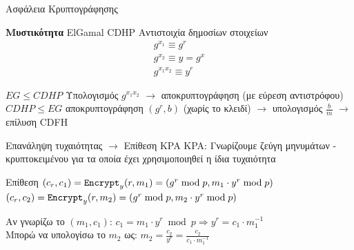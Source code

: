 \documentclass[handout]{beamer}
\begin{document}
\begin{frame}{Ασφάλεια Κρυπτογράφησης}
\begin{block}{\textbf{Μυστικότητα} ElGamal \equiv CDHP}
Αντιστοιχία δημοσίων στοιχείων
\begin{align*}
g^{x_1} \equiv g^r  \\
g^{x_2} \equiv y=g^x \\
g^{x_1x_2} \equiv y^r
\end{align*}

$EG \leq CDHP$ Υπολογισμός $g^{x_1x_2}$ $\rightarrow$ αποκρυπτογράφηση (με εύρεση αντιστρόφου)\\

$CDHP \leq EG$ αποκρυπτογράφηση $(g^r,b)$ (χωρίς το κλειδί) $\rightarrow$ υπολογισμός $\frac{b}{m}$ $\rightarrow$ επίλυση CDFH
\end{block}

\end{frame}

\begin{frame}{Επανάληψη τυχαιότητας $\rightarrow$ Επίθεση KPA}
KPA: Γνωρίζουμε  ζεύγη μηνυμάτων - κρυπτοκειμένου για τα οποία έχει χρησιμοποιηθεί η ίδια τυχαιότητα
\pause
\begin{block}{Επίθεση}
$(c_r,c_1) = \mathtt{Encrypt}_y(r,m_1) = (g^r \bmod p, m_1 \cdot y^r \bmod p)$
$(c_r,c_2) = \mathtt{Encrypt}_y(r,m_2) = (g^r \bmod p, m_2 \cdot y^r \bmod p)$
\end{block}
\pause
Αν γνωρίζω το $(m_1,c_1)$:
$c_1 = m_1 \cdot y^r \bmod p \Rightarrow y^r = c_1 \cdot m_1^{-1}$\\
\medskip
\pause
Μπορώ να υπολογίσω το $m_2$ ως:
$m_2 = \frac{c_2}{y^r} = \frac{c_2}{c_1 \cdot m_1^{-1}}$
\end{frame}
\end{document}

